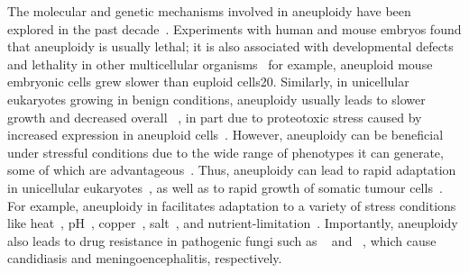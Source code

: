 \documentclass[12pt]{extarticle}
\begin{document}
The molecular and genetic mechanisms involved in aneuploidy have been explored in the past decade~\citep{Chen2012b, Rancati2013, Gerstein2015, Shor2015, Sheltzer2011, Musacchio2007}.
Experiments with human and mouse embryos found that aneuploidy is usually lethal;
it is also associated with developmental defects and lethality in other multicellular organisms~\citep{Sheltzer2011} for example, aneuploid mouse embryonic cells grew slower than euploid cells20.
Similarly, in unicellular eukaryotes growing in benign conditions, aneuploidy usually leads to slower growth and decreased overall ~\citep{Sheltzer2011, Pavelka2010, Torres2007, Kasuga2016, Niwa2006}, in part due to proteotoxic stress caused by increased expression in aneuploid cells~\citep{Pavelka2010, Santaguida2015, Zhu2018}.
However, aneuploidy can be beneficial under stressful conditions due to the wide range of phenotypes it can generate, some of which are advantageous~\citep{Pavelka2010}.
Thus, aneuploidy can lead to rapid adaptation in unicellular eukaryotes~\citep{Gerstein2015,Torres2010, Hong2014, Rancati2008}, as well as to rapid growth of somatic tumour cells~\citep{Schvartzman2010, Sheltzer2017}.
For example, aneuploidy in \yeast facilitates adaptation to a variety of stress conditions like heat~\citep{Yona2012}, pH~\citep{Yona2012}, copper~\citep{Covo2014, Gerstein2015}, salt~\citep{Dhar2011}, and nutrient-limitation~\citep{Dunham2002, Gresham2008}.
Importantly, aneuploidy also leads to drug resistance in pathogenic fungi such as \calbicans~\citep{Selmecki2010, Selmecki2008, Gerstein2018} and \cneoformans~\citep{Sionov2010}, which cause candidiasis and meningoencephalitis, respectively.
\end{document}
